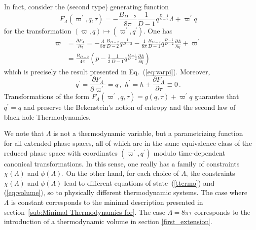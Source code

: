\documentclass[prd,onecolumn,notitlepage,amsmath,nofootinbib,superscriptaddress,showpacs,showkeys]{revtex4-1}
\begin{document}
In fact, consider the (second type) generating function 
\begin{equation}
F_{\Lambda}\left(\varpi^{\prime},q,\tau\right)=-\frac{B_{D-2}}{8\pi}\frac{1}{D-1}q^{\frac{D-1}{D-2}}\Lambda+\varpi^{\prime}q\label{tc}
\end{equation}
for the transformation $\left(\varpi,q\right)\mapsto\left(\varpi^{\prime},q^{\prime}\right)$.
One has 
\begin{align}
\varpi & =\frac{\partial F_{\Lambda}}{\partial q}=-\frac{\Lambda}{8\pi}\frac{B_{D-2}}{D-2}q^{\frac{1}{D-2}}-\frac{1}{8\pi}\frac{B_{D-2}}{D-1}q^{\frac{D-1}{D-2}}\frac{\partial\Lambda}{\partial q}+\varpi^{\prime}\nonumber \\
 & =\frac{B_{D-2}}{4\pi}\left(p-\frac{1}{2}\frac{1}{D-1}q^{\frac{D-1}{D-2}}\frac{\partial\Lambda}{\partial q}\right)
\end{align}
which is precisely the result presented in Eq.~(\ref{eq:varpi}).
Moreover, 
\begin{equation}
q^{\prime}=\frac{\partial F_{\Lambda}}{\partial\varpi^{\prime}}=q\,,\,\, h^{\prime}=h+\frac{\partial F_{\Lambda}}{\partial\tau}\equiv0\,.\label{qh}
\end{equation}
Transformations of the form $F_{\Lambda}\left(\varpi^{\prime},q,\tau\right)=g\left(q,\tau\right)+\varpi^{\prime}q$
guarantee that $q^{\prime}=q$ and preserve the Bekenstein's notion
of entropy and the second law of black hole Thermodynamics.

We note that $\Lambda$ is not a thermodynamic variable, but a parametrizing
function for all extended phase spaces, all of which are in the same
equivalence class of the reduced phase space with coordinates $\left(\varpi^{\prime},q^{\prime}\right)$
modulo time-dependent canonical transformations. In this sense, one
really has a family of constraints $\chi\left(\Lambda\right)$ and
$\phi\left(\Lambda\right)$. On the other hand, for each choice of
$\Lambda$, the constraints $\chi\left(\Lambda\right)$ and $\phi\left(\Lambda\right)$
lead to different equations of state~(\ref{ttermo}) and (\ref{eq:volume}),
so to physically different thermodynamic systems. The case where $\Lambda$
is constant corresponds to the minimal description presented in section~\ref{sub:Minimal-Thermodynamics-for}.
The case $\Lambda=8\pi\tau$ corresponds to the introduction of a
thermodynamic volume in section \ref{first_extension}.
\end{document}
